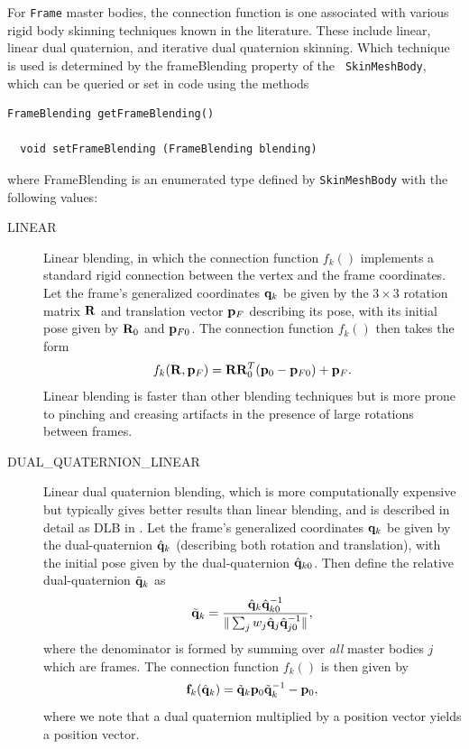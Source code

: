 For {\tt Frame} master bodies, the connection function is one
associated with various rigid body skinning techniques known in the
literature. These include linear, linear dual quaternion, and
iterative dual quaternion skinning. Which technique is used is
determined by the {\sf frameBlending} property of the {\tt
SkinMeshBody}, which can be queried or set in code using the methods
%
\begin{lstlisting}[]
  FrameBlending getFrameBlending()

  void setFrameBlending (FrameBlending blending)
\end{lstlisting}
%
where %
{FrameBlending}
is an enumerated type defined by {\tt SkinMeshBody} with the following
values:

\begin{description}

\item[LINEAR]\mbox{}

Linear blending, in which the connection function $f_k()$ implements a
standard rigid connection between the vertex and the frame
coordinates. Let the frame's generalized coordinates ${\bf q}_k$ be given
by the $3 \times 3$ rotation matrix ${\bf R}$ and translation vector ${\bf p}_F$
describing its pose, with its initial pose given by ${\bf R}_{0}$ and
${\bf p}_{F0}$. The connection function $f_k()$ then takes the form
%
\begin{equation}
f_k ({\bf R}, {\bf p}_F) = {\bf R} {\bf R}_0^T ( {\bf p}_0 - {\bf p}_{F0}) + {\bf p}_F.
\end{equation}
%
Linear blending is faster than other blending techniques but is more
prone to pinching and creasing artifacts in the presence of large
rotations between frames.

\item[DUAL\_QUATERNION\_LINEAR]\mbox{}

Linear dual quaternion blending, which is more computationally
expensive but typically gives better results than linear blending, and
is described in detail as DLB in \cite{kavan2008geometric}. Let the
frame's generalized coordinates ${\bf q}_k$ be given by the dual-quaternion
$\hat{{\bf q}}_k$ (describing both rotation and translation), with the
initial pose given by the dual-quaternion $\hat{{\bf q}}_{k0}$.  Then define
the relative dual-quaternion $\tilde{{\bf q}}_k$ as
%
\begin{equation}
\tilde{{\bf q}}_k = 
\frac{\hat{{\bf q}}_k \hat{{\bf q}}_{k0}^{-1}}{\| \sum_j w_j \hat{{\bf q}}_j \hat{{\bf q}}_{j0}^{-1} \|},
\end{equation}
%
where the denominator is formed by summing over {\it all} master
bodies $j$ which are frames.  The connection function $f_k()$ is then
given by
%
\begin{equation}
{\bf f}_k (\hat{{\bf q}}_k) = \tilde{{\bf q}}_k {\bf p}_0 \tilde{{\bf q}}_k^{-1} - {\bf p}_0,
\end{equation}
%
where we note that a dual quaternion multiplied by a position vector
yields a position vector.


\end{description}
